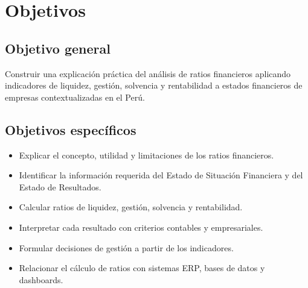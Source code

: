\section{Objetivos}
\subsection{Objetivo general}
Construir una explicación práctica del análisis de ratios financieros aplicando indicadores de liquidez, gestión, solvencia y rentabilidad a estados financieros de empresas contextualizadas en el Perú.

\subsection{Objetivos específicos}
\begin{itemize}
  \item Explicar el concepto, utilidad y limitaciones de los ratios financieros.
  \item Identificar la información requerida del Estado de Situación Financiera y del Estado de Resultados.
  \item Calcular ratios de liquidez, gestión, solvencia y rentabilidad.
  \item Interpretar cada resultado con criterios contables y empresariales.
  \item Formular decisiones de gestión a partir de los indicadores.
  \item Relacionar el cálculo de ratios con sistemas ERP, bases de datos y dashboards.
\end{itemize}
